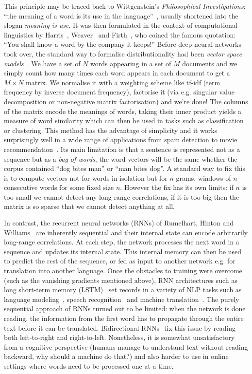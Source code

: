 This principle may be traced back to Wittgenstein's \emph{Philosophical Investigations}: ``the meaning of a word is its use in the language''~\cite{Wittgenstein53}, usually shortened into the slogan \emph{meaning is use}.
It was then formulated in the context of computational linguistics by Harris~\cite{Harris54}, Weaver~\cite{Weaver55} and Firth~\cite{Firth57}, who coined the famous quotation: ``You shall know a word by the company it keeps!''
Before deep neural networks took over, the standard way to formalise distributionality had been \emph{vector space models}~\cite{SaltonEtAl75}.
We have a set of $N$ words appearing in a set of $M$ documents and we simply count how many times each word appears in each document to get a $M \times N$ matrix.
We normalise it with a weighting scheme like tf-idf (term frequency by inverse document frequency), factorise it (via e.g. singular value decomposition or non-negative matrix factorisation) and we're done!
The columns of the matrix encode the meanings of words, taking their inner product yields a measure of word similarity which can then be used in tasks such as classification or clustering.
This method has the advantage of simplicity and it works surprisingly well in a wide range of applications from spam detection to movie recommendation~\cite{TurneyPantel10}.
Its main limitation is that a sentence is represented not as a sequence but as a \emph{bag of words}, the word vectors will be the same whether the corpus contained ``dog bites man'' or ``man bites dog''.
A standard way to fix this is to compute vectors not for words in isolation but for $n$-grams, windows of $n$ consecutive words for some fixed size $n$.
However the fix has its own limits: if $n$ is too small we cannot detect any long-range correlations, if it is too big then the matrix is so sparse that we cannot detect anything at all.

In contrast, the recurrent neural networks (RNNs) of Rumelhart, Hinton and Williams~\cite{RumelhartEtAl86} are inherently sequential and their internal state can encode arbitrarily long-range correlations.
At each step, the network processes the next word in a sequence and updates its internal state.
This internal memory can then be used to predict the rest of the sequence, or fed as input to another network e.g. for translation into another language.
Once the obstacles to training were overcome (such as the vanishing gradients mentioned above), RNN architectures such as long short-term memory (LSTM)~\cite{HochreiterSchmidhuber97} set records in a variety of NLP tasks such as language modeling~\cite{SutskeverEtAl11}, speech recognition~\cite{GravesEtAl13} and machine translation~\cite{SutskeverEtAl14}.
The purely sequential approach of RNNs turned out to be limited: when the network is done reading, the information from the first word has to propagate through the entire text before it can be translated.
Bidirectional RNNs~\cite{SchusterPaliwal97} fix this issue by reading both left-to-right and right-to-left.
Nonetheless, it is somewhat unsatisfactory from a cognitive perspective (humans manage to understand text without reading backward, why should a machine do that?) and also harder to use in online settings where words need to be processed one at a time.

